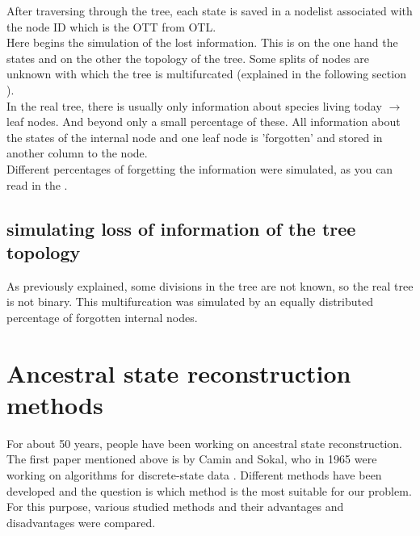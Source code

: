       After traversing through the tree, each state is saved in a nodelist associated with the node ID 
        which is the OTT from OTL. \\

      Here begins the simulation of the lost information. This is on the one hand the states and on the 
        other the topology of the tree. Some splits of nodes are unknown with which the tree is 
        multifurcated (explained in the following section ). \\

      In the real tree, there is usually only information about species living today $\rightarrow$ leaf 
        nodes. And beyond only a small percentage of these. All information about the states of the 
        internal node and one leaf node is 'forgotten' and stored in another column to the node. \\
      Different percentages of forgetting the information were simulated, as you can read in the 
      .

    \subsection{simulating loss of information of the tree topology}
      As previously explained, some divisions in the tree are not known, so the real tree is not binary.
      This multifurcation was simulated by an equally distributed percentage of forgotten internal nodes.

    \section{Ancestral state reconstruction methods}
      For about 50 years, people have been working on ancestral state reconstruction. The first paper 
        mentioned above is by Camin and Sokal, who in 1965 were working on algorithms for discrete-state 
        data \cite{Camin1965}. Different methods have been developed and the question is which method is 
        the most suitable for our problem. \\
      For this purpose, various studied methods and their advantages and disadvantages were compared. \\
    
